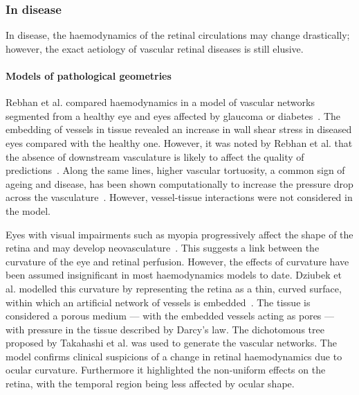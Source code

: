 \documentclass{article}
\begin{document}
\subsubsection{In disease}

In disease, the haemodynamics of the retinal circulations may change drastically; however, the exact aetiology of vascular retinal diseases is still elusive.

\paragraph*{Models of pathological geometries} 

Rebhan et al. compared haemodynamics in a model of vascular networks segmented from a healthy eye and eyes affected by glaucoma or diabetes~\cite{Rebhan_2019}.
The embedding of vessels in tissue revealed an increase in wall shear stress in diseased eyes compared with the healthy one.
However, it was noted by Rebhan et al. that the absence of downstream vasculature is likely to affect the quality of predictions~\cite{Rebhan_2019}.
Along the same lines, higher vascular tortuosity, a common sign of ageing and disease, has been shown computationally to increase the pressure drop across the vasculature~\cite{Malek_2014}.
However, vessel-tissue interactions were not considered in the model.

Eyes with visual impairments such as myopia progressively affect the shape of the retina and may develop neovasculature~\cite{Medina_2016}.
This suggests a link between the curvature of the eye and retinal perfusion.
However, the effects of curvature have been assumed insignificant in most haemodynamics models to date.
Dziubek et al. modelled this curvature by representing the retina as a thin, curved surface, within which an artificial network of vessels is embedded~\cite{Dziubek_2015}.
The tissue is considered a porous medium --- with the embedded vessels acting as pores --- with pressure in the tissue described by Darcy's law.
The dichotomous tree proposed by Takahashi et al. was used to generate the vascular networks.
The model confirms clinical suspicions of a change in retinal haemodynamics due to ocular curvature.
Furthermore it highlighted the non-uniform effects on the retina, with the temporal region being less affected by ocular shape\cite{Dziubek_2015}.
\end{document}
